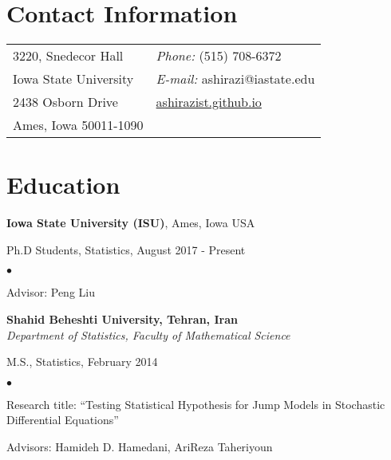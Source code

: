 \documentclass[margin,line]{res}
\newenvironment{list1}{
  \begin{list}{\ding{113}}{%
      \setlength{\itemsep}{0in}
      \setlength{\parsep}{0in} \setlength{\parskip}{0in}
      \setlength{\topsep}{0in} \setlength{\partopsep}{0in}
      \setlength{\leftmargin}{0.17in}}}{\end{list}}
\newenvironment{list2}{
  \begin{list}{$\bullet$}{%
      \setlength{\itemsep}{0in}
      \setlength{\parsep}{0in} \setlength{\parskip}{0in}
      \setlength{\topsep}{0in} \setlength{\partopsep}{0in}
      \setlength{\leftmargin}{0.2in}}}{\end{list}}
\begin{document}
\nocite{*}

\begin{resume}

\section{\sc Contact Information}
\vspace{.05in}
\begin{tabular}{@{}p{2in}p{4in}}
3220, Snedecor Hall &	{\it Phone:}  (515) 708-6372 \\
Iowa State University & {\it E-mail:} ashirazi@iastate.edu\\
2438 Osborn Drive & \url{ashirazist.github.io} \\
Ames, Iowa 50011-1090  & \\


\end{tabular}


\section{\sc Education}
{\bf Iowa State University (ISU)}, Ames, Iowa USA\\
\vspace*{-.1in}
\begin{list1}
\item[]Ph.D Students, Statistics, August 2017 - Present 
\begin{list2}
\vspace*{.05in}
\item[] Advisor: Peng Liu
\end{list2}
\vspace*{.05in}

\end{list1}
{\bf Shahid Beheshti University, Tehran, Iran} \\
{\em Department of Statistics, Faculty of Mathematical Science}\\
\vspace*{-.1in}
\begin{list1}
\item[]M.S., Statistics, February 2014
\begin{list2}
\vspace*{.05in}
\item[] Research title:  ``Testing Statistical Hypothesis for Jump Models in Stochastic Differential Equations''
\item[] Advisors: Hamideh D. Hamedani,  AriReza Taheriyoun
\end{list2}
\vspace*{.05in}
\end{list1}


\end{resume}
\end{document}
